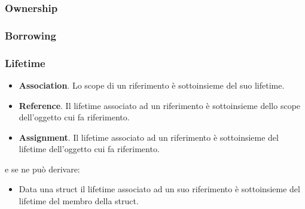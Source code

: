 \documentclass{beamer}
\newcommand{\textcode}[1]{\colorbox{backcolour}{\texttt{#1}}}
\begin{document}

\begin{frame}
    \frametitle{Ownership}
    
\end{frame}


\begin{frame}
    \frametitle{Borrowing}
    
\end{frame}

    

\begin{frame}
    \frametitle{Lifetime}
    \begin{itemize}
        \item \textbf{Association}. Lo scope di un riferimento è sottoinsieme del suo lifetime. 
        \item \textbf{Reference}. Il lifetime associato ad un riferimento è sottoinsieme dello scope dell'oggetto cui fa riferimento.  
        \item \textbf{Assignment}. Il lifetime associato ad un riferimento è sottoinsieme del lifetime dell'oggetto cui fa riferimento.
    \end{itemize}
    e se ne può derivare:
    \begin{itemize}
        \item Data una struct il lifetime associato ad un suo riferimento è sottoinsieme del lifetime del membro della struct. 
    \end{itemize}
\end{frame}
\end{document}
